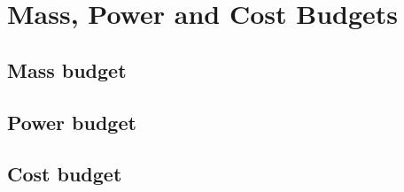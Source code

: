 \chapter{Mass, Power and Cost Budgets}
\label{ch:budgets}
\section{Mass budget}

\section{Power budget}

\section{Cost budget}
